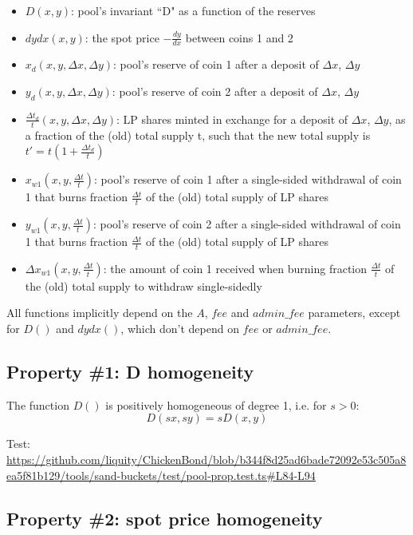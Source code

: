 \documentclass{article}
\begin{document}
\begin{itemize}
\item $D(x, y)$: pool's invariant ``D" as a function of the reserves
\item $dydx(x, y)$: the spot price $-\frac{dy}{dx}$ between coins 1 and 2
\item $x_d(x, y, \Delta{x}, \Delta{y})$: pool's reserve of coin 1 after a deposit of $\Delta{x}$, $\Delta{y}$
\item $y_d(x, y, \Delta{x}, \Delta{y})$: pool's reserve of coin 2 after a deposit of $\Delta{x}$, $\Delta{y}$
\item $\tfrac{\Delta{t}_d}{t}(x, y, \Delta{x}, \Delta{y})$: LP shares minted in exchange for a deposit of $\Delta{x}$, $\Delta{y}$, as a fraction of the (old) total supply t, such that the new total supply is $t' = t(1 + \tfrac{\Delta{t}_d}{t})$
\item $x_{w1}(x, y, \tfrac{\Delta{t}}{t})$: pool's reserve of coin 1 after a single-sided withdrawal of coin 1 that burns fraction $\tfrac{\Delta{t}}{t}$ of the (old) total supply of LP shares
\item $y_{w1}(x, y, \tfrac{\Delta{t}}{t})$: pool's reserve of coin 2 after a single-sided withdrawal of coin 1 that burns fraction $\tfrac{\Delta{t}}{t}$ of the (old) total supply of LP shares
\item $\Delta{x}_{w1}(x, y, \tfrac{\Delta{t}}{t})$: the amount of coin 1 received when burning fraction $\tfrac{\Delta{t}}{t}$ of the (old) total supply to withdraw single-sidedly
\end{itemize}

All functions implicitly depend on the $A$, $fee$ and $admin\_fee$ parameters, except for $D()$ and $dydx()$, which don't depend on $fee$ or $admin\_fee$.

\subsection{Property \#1: D homogeneity}

The function $D()$ is positively homogeneous of degree 1, i.e. for $s > 0$:
\[
D(sx, sy) = sD(x,y)
\]

Test:
\url{https://github.com/liquity/ChickenBond/blob/b344f8d25ad6bade72092e53c505a8ea5f81b129/tools/sand-buckets/test/pool-prop.test.ts#L84-L94}

\subsection{Property \#2: spot price homogeneity}
\end{document}
